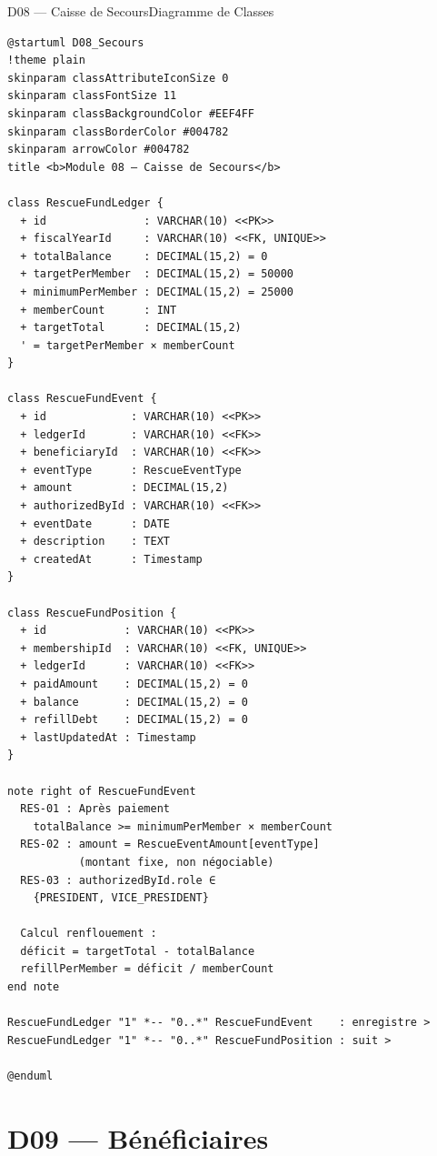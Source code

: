 \documentclass[12pt, a4paper]{report}
\begin{document}
\begin{diagramBox}{D08 — Caisse de Secours}{Diagramme de Classes}
\begin{lstlisting}
@startuml D08_Secours
!theme plain
skinparam classAttributeIconSize 0
skinparam classFontSize 11
skinparam classBackgroundColor #EEF4FF
skinparam classBorderColor #004782
skinparam arrowColor #004782
title <b>Module 08 — Caisse de Secours</b>

class RescueFundLedger {
  + id               : VARCHAR(10) <<PK>>
  + fiscalYearId     : VARCHAR(10) <<FK, UNIQUE>>
  + totalBalance     : DECIMAL(15,2) = 0
  + targetPerMember  : DECIMAL(15,2) = 50000
  + minimumPerMember : DECIMAL(15,2) = 25000
  + memberCount      : INT
  + targetTotal      : DECIMAL(15,2)
  ' = targetPerMember × memberCount
}

class RescueFundEvent {
  + id             : VARCHAR(10) <<PK>>
  + ledgerId       : VARCHAR(10) <<FK>>
  + beneficiaryId  : VARCHAR(10) <<FK>>
  + eventType      : RescueEventType
  + amount         : DECIMAL(15,2)
  + authorizedById : VARCHAR(10) <<FK>>
  + eventDate      : DATE
  + description    : TEXT
  + createdAt      : Timestamp
}

class RescueFundPosition {
  + id            : VARCHAR(10) <<PK>>
  + membershipId  : VARCHAR(10) <<FK, UNIQUE>>
  + ledgerId      : VARCHAR(10) <<FK>>
  + paidAmount    : DECIMAL(15,2) = 0
  + balance       : DECIMAL(15,2) = 0
  + refillDebt    : DECIMAL(15,2) = 0
  + lastUpdatedAt : Timestamp
}

note right of RescueFundEvent
  RES-01 : Après paiement
    totalBalance >= minimumPerMember × memberCount
  RES-02 : amount = RescueEventAmount[eventType]
           (montant fixe, non négociable)
  RES-03 : authorizedById.role ∈
    {PRESIDENT, VICE_PRESIDENT}

  Calcul renflouement :
  déficit = targetTotal - totalBalance
  refillPerMember = déficit / memberCount
end note

RescueFundLedger "1" *-- "0..*" RescueFundEvent    : enregistre >
RescueFundLedger "1" *-- "0..*" RescueFundPosition : suit >

@enduml
\end{lstlisting}
\end{diagramBox}

\section{D09 — Bénéficiaires}
\end{document}

